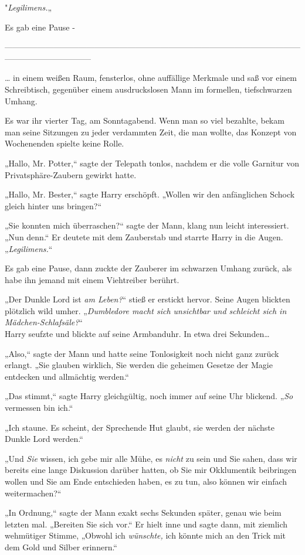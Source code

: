 {"\emph{Legilimens.}„

Es gab eine Pause -

--------------------------------------------------------------------------------------------------------------------------------------------

… in einem weißen Raum, fensterlos, ohne auffällige Merkmale und saß vor einem Schreibtisch, gegenüber einem ausdruckslosen Mann im formellen, tiefschwarzen Umhang.

Es war ihr vierter Tag, am Sonntagabend. Wenn man so viel bezahlte, bekam man seine Sitzungen zu jeder verdammten Zeit, die man wollte, das Konzept von Wochenenden spielte keine Rolle.

„Hallo, Mr. Potter,“ sagte der Telepath tonlos, nachdem er die volle Garnitur von Privatsphäre-Zaubern gewirkt hatte.

„Hallo, Mr. Bester,“ sagte Harry erschöpft. „Wollen wir den anfänglichen Schock gleich hinter uns bringen?“

„Sie konnten mich überraschen?“ sagte der Mann, klang nun leicht interessiert. „Nun denn.“ Er deutete mit dem Zauberstab und starrte Harry in die Augen. „\emph{Legilimens.}“

Es gab eine Pause, dann zuckte der Zauberer im schwarzen Umhang zurück, als habe ihn jemand mit einem Viehtreiber berührt.

„Der Dunkle Lord ist \emph{am Leben?}“ stieß er erstickt hervor. Seine Augen blickten plötzlich wild umher. „\emph{Dumbledore macht sich unsichtbar und schleicht sich in Mädchen-Schlafsäle?}“\\ Harry seufzte und blickte auf seine Armbanduhr. In etwa drei Sekunden…

„Also,“ sagte der Mann und hatte seine Tonlosigkeit noch nicht ganz zurück erlangt. „Sie glauben wirklich, Sie werden die geheimen Gesetze der Magie entdecken und allmächtig werden.“

„Das stimmt,“ sagte Harry gleichgültig, noch immer auf seine Uhr blickend. „\emph{So} vermessen bin ich.“

„Ich staune. Es scheint, der Sprechende Hut glaubt, sie werden der nächste Dunkle Lord werden.“

„Und \emph{Sie} wissen, ich gebe mir alle Mühe, es \emph{nicht} zu sein und Sie sahen, dass wir bereits eine lange Diskussion darüber hatten, ob Sie mir Okklumentik beibringen wollen und Sie am Ende entschieden haben, es zu tun, also können wir einfach weitermachen?“

„In Ordnung,“ sagte der Mann exakt sechs Sekunden später, genau wie beim letzten mal. „Bereiten Sie sich vor.“ Er hielt inne und sagte dann, mit ziemlich wehmütiger Stimme, „Obwohl ich \emph{wünschte,} ich könnte mich an den Trick mit dem Gold und Silber erinnern.“

}
